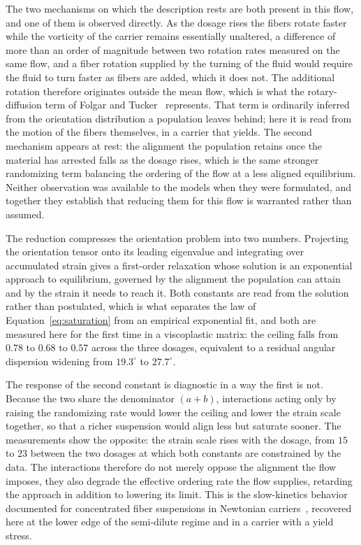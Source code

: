 \documentclass[%
  aip,
  pof,          %
  reprint,      %
  floatfix
]{revtex4-2}
\begin{document}
The two mechanisms on which the description rests are both present in this flow, and one of them is observed directly. As the dosage rises the fibers rotate faster while the vorticity of the carrier remains essentially unaltered, a difference of more than an order of magnitude between two rotation rates measured on the same flow, and a fiber rotation supplied by the turning of the fluid would require the fluid to turn faster as fibers are added, which it does not. The additional rotation therefore originates outside the mean flow, which is what the rotary-diffusion term of Folgar and Tucker~\cite{folgar1984orientation} represents. That term is ordinarily inferred from the orientation distribution a population leaves behind; here it is read from the motion of the fibers themselves, in a carrier that yields. The second mechanism appears at rest: the alignment the population retains once the material has arrested falls as the dosage rises, which is the same stronger randomizing term balancing the ordering of the flow at a less aligned equilibrium. Neither observation was available to the models when they were formulated, and together they establish that reducing them for this flow is warranted rather than assumed.

The reduction compresses the orientation problem into two numbers. Projecting the orientation tensor onto its leading eigenvalue and integrating over accumulated strain gives a first-order relaxation whose solution is an exponential approach to equilibrium, governed by the alignment the population can attain and by the strain it needs to reach it. Both constants are read from the solution rather than postulated, which is what separates the law of Equation~\eqref{eq:saturation} from an empirical exponential fit, and both are measured here for the first time in a viscoplastic matrix: the ceiling falls from $0.78$ to $0.68$ to $0.57$ across the three dosages, equivalent to a residual angular dispersion widening from $19.3^\circ$ to $27.7^\circ$.

The response of the second constant is diagnostic in a way the first is not. Because the two share the denominator $(a+b)$, interactions acting only by raising the randomizing rate would lower the ceiling and lower the strain scale together, so that a richer suspension would align less but saturate sooner. The measurements show the opposite: the strain scale rises with the dosage, from $15$ to $23$ between the two dosages at which both constants are constrained by the data. The interactions therefore do not merely oppose the alignment the flow imposes, they also degrade the effective ordering rate the flow supplies, retarding the approach in addition to lowering its limit. This is the slow-kinetics behavior documented for concentrated fiber suspensions in Newtonian carriers~\cite{wang2008objective}, recovered here at the lower edge of the semi-dilute regime and in a carrier with a yield stress.
\end{document}
